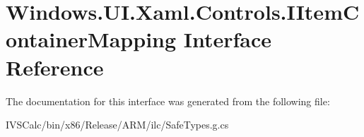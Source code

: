 \hypertarget{interface_windows_1_1_u_i_1_1_xaml_1_1_controls_1_1_i_item_container_mapping}{}\section{Windows.\+U\+I.\+Xaml.\+Controls.\+I\+Item\+Container\+Mapping Interface Reference}
\label{interface_windows_1_1_u_i_1_1_xaml_1_1_controls_1_1_i_item_container_mapping}


The documentation for this interface was generated from the following file\+:\begin{DoxyCompactItemize}
\item 
I\+V\+S\+Calc/bin/x86/\+Release/\+A\+R\+M/ilc/Safe\+Types.\+g.\+cs\end{DoxyCompactItemize}
